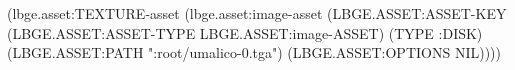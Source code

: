 (lbge.asset:TEXTURE-asset
 (lbge.asset:image-asset
  (LBGE.ASSET:ASSET-KEY
   (LBGE.ASSET:ASSET-TYPE LBGE.ASSET:image-ASSET) (TYPE :DISK)
   (LBGE.ASSET:PATH ":root/umalico-0.tga") (LBGE.ASSET:OPTIONS NIL))))
